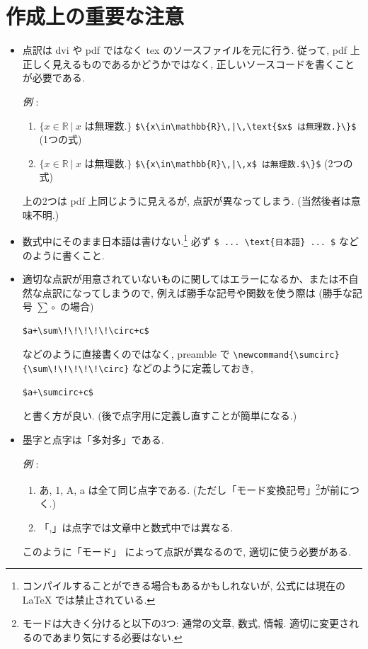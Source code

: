 \documentclass[lualatex,ja=standard,jafont=haranoaji]{bxjsarticle}
\def\eg{\par\emph{例} :  }
\begin{document}
\bigskip
\section{作成上の重要な注意}

\begin{itemize}
\item 点訳は dvi や pdf ではなく tex のソースファイルを元に行う.
  従って, pdf 上正しく見えるものであるかどうかではなく, 正しいソースコードを書くことが必要である.

  \eg
  \begin{enumerate}
  \item 
    $\{x\in\mathbb{R}~|~\text{$x$ は無理数.}\}$ \qquad \verb!$\{x\in\mathbb{R}\,|\,\text{$x$ は無理数.}\}$! \quad (1つの式)
  \item
    $\{x\in\mathbb{R}~|~x$ は無理数.$\}$
    \qquad \verb!$\{x\in\mathbb{R}\,|\,x$ は無理数.$\}$! \quad (2つの式)
  \end{enumerate}
  上の2つは pdf 上同じように見えるが, 点訳が異なってしまう. (当然後者は意味不明.)


\item 数式中にそのまま日本語は書けない.\footnote{コンパイルすることができる場合もあるかもしれないが, 公式には現在の LaTeX では禁止されている.} 必ず \verb|$ ... \text{日本語} ... $| などのように書くこと.

\item 適切な点訳が用意されていないものに関してはエラーになるか、または不自然な点訳になってしまうので, 例えば勝手な記号や関数を使う際は (勝手な記号 $\sum\!\!\!\!\!\circ$ の場合)
\begin{verbatim}
$a+\sum\!\!\!\!\!\circ+c$
\end{verbatim}
などのように直接書くのではなく, preamble で \verb|\newcommand{\sumcirc}{\sum\!\!\!\!\!\circ}| などのように定義しておき,
\begin{verbatim}
$a+\sumcirc+c$
\end{verbatim}
と書く方が良い. (後で点字用に定義し直すことが簡単になる.)

\item 墨字と点字は「多対多」である.
  \eg
  \begin{enumerate}
  \item   あ, 1, A, a は全て同じ点字である.
    (ただし「モード変換記号」\footnote{モードは大きく分けると以下の3つ: 通常の文章, 数式, 情報. 適切に変更されるのであまり気にする必要はない.}が前につく.)
  \item 「,」は点字では文章中と数式中では異なる.
  \end{enumerate}
  このように「モード」%
  によって点訳が異なるので, 適切に使う必要がある.


\end{itemize}
\end{document}
